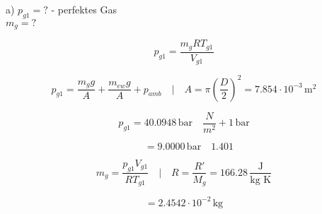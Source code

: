 a) $p_{g1} = ?$ \quad - perfektes Gas \\
\quad $m_g = ?$

\[
p_{g1} = \frac{m_g R T_{g1}}{V_{g1}}
\]

\[
p_{g1} = \frac{m_g g}{A} + \frac{m_{ew} g}{A} + p_{amb} \quad \Bigg| \quad A = \pi \left(\frac{D}{2}\right)^2 = 7.854 \cdot 10^{-3} \, \text{m}^2
\]

\[
p_{g1} = 40.0948 \, \text{bar} \quad \frac{N}{m^2} + 1 \, \text{bar}
\]

\[
\quad = 9.0000 \, \text{bar} \quad 1.401
\]

\[
m_g = \frac{p_{g1} V_{g1}}{R T_{g1}} \quad \Bigg| \quad R = \frac{R'}{M_g} = 166.28 \, \frac{\text{J}}{\text{kg K}}
\]

\[
= 2.4542 \cdot 10^{-2} \, \text{kg}
\]